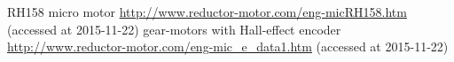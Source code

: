 \documentclass[11pt]{article}
\begin{document}
\begin{thebibliography}{99}
 RH158 micro motor \url{http://www.reductor-motor.com/eng-micRH158.htm} (accessed at 2015-11-22)
 gear-motors with Hall-effect encoder \url{http://www.reductor-motor.com/eng-mic_e_data1.htm} (accessed at 2015-11-22)
\end{thebibliography}
\end{document}
